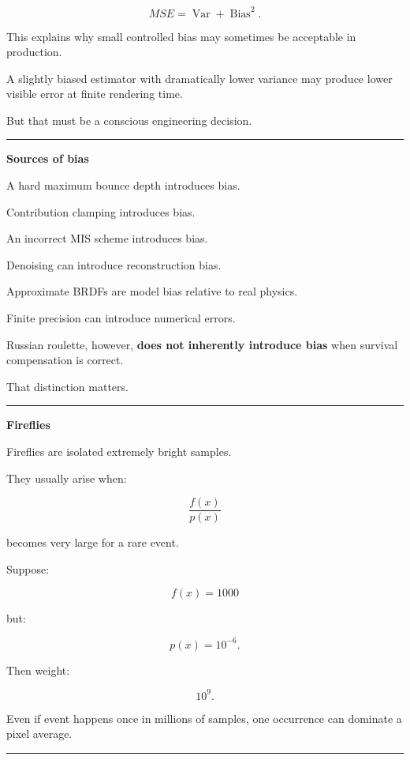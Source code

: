 \[
\boxed{
MSE
=
\operatorname{Var}
+
\operatorname{Bias}^2.
}
\]

This explains why small controlled bias may sometimes be acceptable in production.

A slightly biased estimator with dramatically lower variance may produce lower visible error at finite rendering time.

But that must be a conscious engineering decision.

\begin{center}\rule{0.5\linewidth}{0.5pt}\end{center}

\textbf{Sources of bias}

A hard maximum bounce depth introduces bias.

Contribution clamping introduces bias.

An incorrect MIS scheme introduces bias.

Denoising can introduce reconstruction bias.

Approximate BRDFs are model bias relative to real physics.

Finite precision can introduce numerical errors.

Russian roulette, however, \textbf{does not inherently introduce bias} when survival compensation is correct.

That distinction matters.

\begin{center}\rule{0.5\linewidth}{0.5pt}\end{center}

\textbf{Fireflies}

Fireflies are isolated extremely bright samples.

They usually arise when:

\[
\boxed{
\frac{f(x)}{p(x)}
}
\]

becomes very large for a rare event.

Suppose:

\[
f(x)=1000
\]

but:

\[
p(x)=10^{-6}.
\]

Then weight:

\[
10^9.
\]

Even if event happens once in millions of samples, one occurrence can dominate a pixel average.

\begin{center}\rule{0.5\linewidth}{0.5pt}\end{center}

